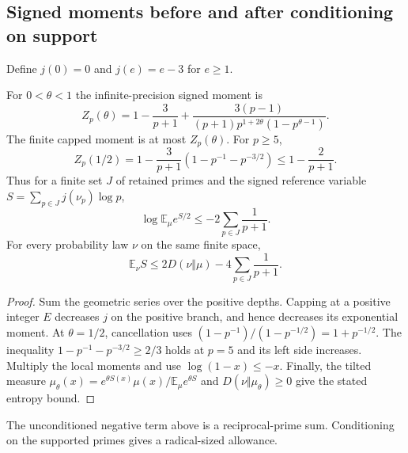 \subsection{Signed moments before and after conditioning on support}
Define $j(0)=0$ and $j(e)=e-3$ for $e\ge1$.
\begin{theorem}\label{se-moment}
For $0<\theta<1$ the infinite-precision signed moment is
\[
 Z_p(\theta)=1-\frac3{p+1}
 +\frac{3(p-1)}{(p+1)p^{1+2\theta}(1-p^{\theta-1})}.
\]
The finite capped moment is at most $Z_p(\theta)$. For $p\ge5$,
\[
 Z_p(1/2)=1-\frac3{p+1}(1-p^{-1}-p^{-3/2})
 \le1-\frac2{p+1}.
\]
Thus for a finite set $J$ of retained primes and the signed reference
variable $S=\sum_{p\in J}j(\nu_p)\log p$,
\[
 \log\mathbb E_\mu e^{S/2}\le-2\sum_{p\in J}\frac1{p+1}.
\]
For every probability law $\nu$ on the same finite space,
\[
 \mathbb E_\nu S\le2D(\nu\Vert\mu)
                       -4\sum_{p\in J}\frac1{p+1}.
\]
\end{theorem}
\begin{proof}
Sum the geometric series over the positive depths. Capping at a positive
integer $E$ decreases $j$ on the positive branch, and hence decreases
its exponential moment. At $\theta=1/2$, cancellation uses
$(1-p^{-1})/(1-p^{-1/2})=1+p^{-1/2}$.
The inequality $1-p^{-1}-p^{-3/2}\ge2/3$ holds at $p=5$ and its
left side increases. Multiply the local moments and use
$\log(1-x)\le-x$. Finally, the tilted measure
$\mu_\theta(x)=e^{\theta S(x)}\mu(x)/\mathbb E_\mu e^{\theta S}$
and $D(\nu\Vert\mu_\theta)\ge0$ give the stated entropy bound.
\end{proof}
The unconditioned negative term above is a reciprocal-prime sum.
Conditioning on the supported primes gives a radical-sized allowance.

